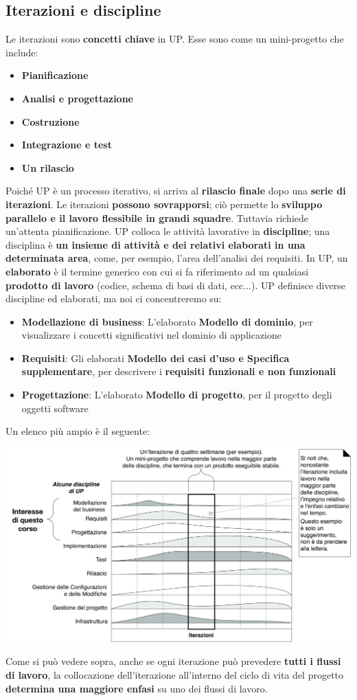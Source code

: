 \documentclass[12pt]{article}
\begin{document}
\subsection{Iterazioni e discipline}
Le iterazioni sono \textbf{concetti chiave} in UP. Esse sono come un mini-progetto che include:
\begin{itemize}
    \item \textbf{Pianificazione}
    \item \textbf{Analisi e progettazione}
    \item \textbf{Costruzione}
    \item \textbf{Integrazione e test}
    \item \textbf{Un rilascio}
\end{itemize}
Poiché UP è un processo iterativo, si arriva al \textbf{rilascio finale} dopo una \textbf{serie di iterazioni}. 
Le iterazioni \textbf{possono sovrapporsi}; ciò permette lo \textbf{sviluppo parallelo e il lavoro flessibile in grandi squadre}.
Tuttavia richiede un'attenta pianificazione. \newline
UP colloca le attività lavorative in \textbf{discipline}; una disciplina è \textbf{un insieme di attività e dei relativi elaborati in una determinata area}, come, per esempio, l'area dell'analisi dei requisiti.
In UP, un \textbf{elaborato} è il termine generico con cui si fa riferimento ad un qualsiasi \textbf{prodotto di lavoro} (codice, schema di basi di dati, ecc...).
UP definisce diverse discipline ed elaborati, ma noi ci concentreremo su:
\begin{itemize}
    \item \textbf{Modellazione di business}: L'elaborato \textbf{Modello di dominio}, per visualizzare i concetti significativi nel dominio di applicazione
    \item \textbf{Requisiti}: Gli elaborati \textbf{Modello dei casi d'uso e Specifica supplementare}, per descrivere i \textbf{requisiti funzionali e non funzionali}
    \item \textbf{Progettazione}: L'elaborato \textbf{Modello di progetto}, per il progetto degli oggetti software
\end{itemize}
Un elenco più ampio è il seguente:
\begin{center}
    \includegraphics[width = 1.10\textwidth]{Images/19.png}
\end{center}
Come si può vedere sopra, anche se ogni iterazione può prevedere \textbf{tutti i flussi di lavoro}, la collocazione dell'iterazione all'interno del ciclo di vita del progetto \textbf{determina una maggiore enfasi} su uno dei flussi di lavoro.
\end{document}
